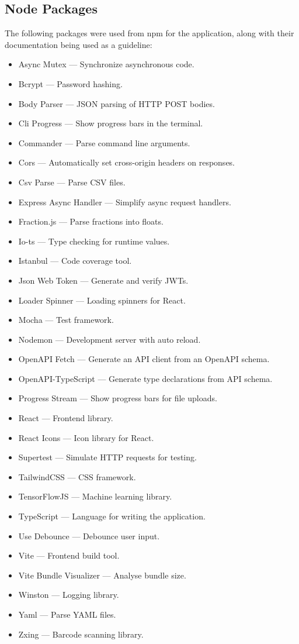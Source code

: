 \documentclass[11pt, twoside, a4paper]{report}
\begin{document}
\subsection{Node Packages}
The following packages were used from npm for the application, along with their documentation
being used as a guideline:
\begin{itemize}
    \item Async Mutex --- Synchronize asynchronous code.
    \item Bcrypt --- Password hashing.
    \item Body Parser --- JSON parsing of HTTP POST bodies.
    \item Cli Progress --- Show progress bars in the terminal.
    \item Commander --- Parse command line arguments.
    \item Cors --- Automatically set cross-origin headers on responses.
    \item Csv Parse --- Parse CSV files.
    \item Express Async Handler --- Simplify async request handlers.
    \item Fraction.js --- Parse fractions into floats.
    \item Io-ts --- Type checking for runtime values.
    \item Istanbul --- Code coverage tool.
    \item Json Web Token --- Generate and verify JWTs.
    \item Loader Spinner --- Loading spinners for React.
    \item Mocha --- Test framework.
    \item Nodemon --- Development server with auto reload.
    \item OpenAPI Fetch --- Generate an API client from an OpenAPI schema.
    \item OpenAPI-TypeScript --- Generate type declarations from API schema.
    \item Progress Stream --- Show progress bars for file uploads.
    \item React --- Frontend library.
    \item React Icons --- Icon library for React.
    \item Supertest --- Simulate HTTP requests for testing.
    \item TailwindCSS --- CSS framework.
    \item TensorFlowJS --- Machine learning library.
    \item TypeScript --- Language for writing the application.
    \item Use Debounce --- Debounce user input.
    \item Vite --- Frontend build tool.
    \item Vite Bundle Visualizer --- Analyse bundle size.
    \item Winston --- Logging library.
    \item Yaml --- Parse YAML files.
    \item Zxing --- Barcode scanning library.
\end{itemize}
\end{document}
